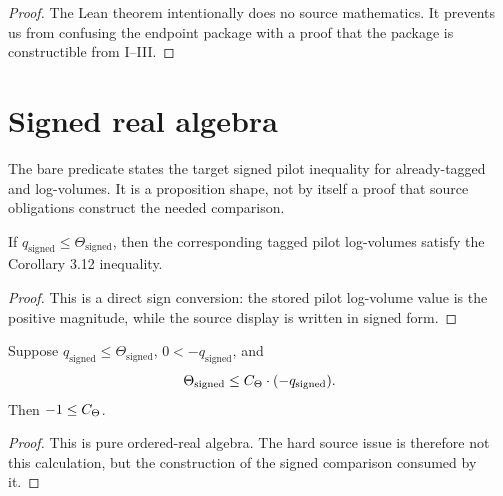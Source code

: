 \begin{proof}
  The Lean theorem intentionally does no source mathematics.  It prevents us
  from confusing the endpoint package with a proof that the package is
  constructible from \IUT{} I--III.
\end{proof}

\section{Signed real algebra}

\begin{definition}
  \label{def:corollary-312-predicate-shape}
  \leanok
  The bare predicate states the target signed pilot inequality for
  already-tagged \ThetaPilot{} and \qPilot{} log-volumes.  It is a proposition
  shape, not by itself a proof that source obligations construct the needed
  comparison.
\end{definition}

\begin{lemma}
  \label{lem:signed-comparison-gives-corollary}
  \leanok
  If \(q_{\mathrm{signed}}\le \Theta_{\mathrm{signed}}\), then the corresponding
  tagged pilot log-volumes satisfy the Corollary 3.12 inequality.
\end{lemma}

\begin{proof}
  This is a direct sign conversion: the stored pilot log-volume value is the
  positive magnitude, while the source display is written in signed form.
\end{proof}

\begin{theorem}
  \label{thm:final-real-calculation}
  \leanok
  Suppose \(q_{\mathrm{signed}}\le \Theta_{\mathrm{signed}}\),
  \(0<-q_{\mathrm{signed}}\), and
  \[
    \Theta_{\mathrm{signed}}\le
      C_\Theta\cdot(-q_{\mathrm{signed}}).
  \]
  Then \(-1\le C_\Theta\).
\end{theorem}

\begin{proof}
  This is pure ordered-real algebra.  The hard source issue is therefore not
  this calculation, but the construction of the signed comparison consumed by
  it.
\end{proof}

